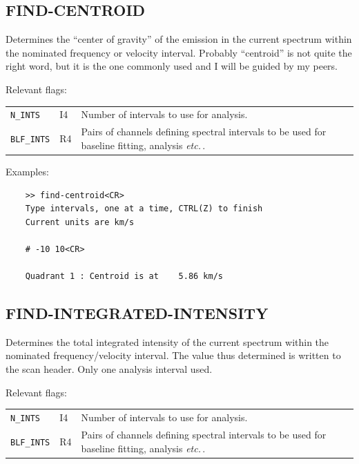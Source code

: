 \documentclass[11pt,twoside]{report}
\newcommand{\etc}{{\it etc.\,}}
\begin{document}
\subsection{FIND-CENTROID} 

Determines the ``center of gravity'' of the emission in the current spectrum
within the nominated frequency or velocity interval. Probably ``centroid''
is not quite the right word, but it is the one commonly used and I will
be guided by my peers.

Relevant flags:\\
\begin{tabular}{lll}
  \verb+N_INTS+   & I4 & Number of intervals to use for analysis.\\
  \verb+BLF_INTS+ & R4 & \parbox[t]{4in}
                          {Pairs of channels defining spectral intervals to
                           be used for baseline fitting, analysis \etc.}
\end{tabular}

Examples:
\begin{verbatim}
    >> find-centroid<CR>
    Type intervals, one at a time, CTRL(Z) to finish
    Current units are km/s

    # -10 10<CR>

    Quadrant 1 : Centroid is at    5.86 km/s
\end{verbatim}

\subsection{FIND-INTEGRATED-INTENSITY} 

Determines the total integrated intensity of the current spectrum within the
nominated frequency/velocity interval. The value thus determined is
written to the scan header. Only one analysis interval used.

Relevant flags:\\
\begin{tabular}{lll}
  \verb+N_INTS+   & I4 & Number of intervals to use for analysis.\\
  \verb+BLF_INTS+ & R4 & \parbox[t]{4in}
                         {Pairs of channels defining spectral intervals to
                          be used for baseline fitting, analysis \etc.}
\end{tabular}
\end{document}
